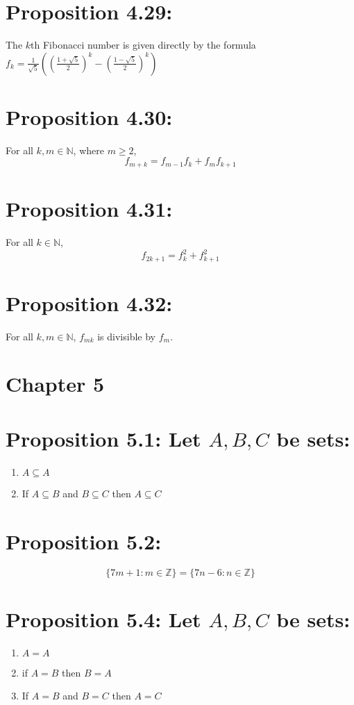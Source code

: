 \section*{Proposition 4.29:}
The $k$th Fibonacci number is given directly by the formula
$f_k = \frac{1}{\sqrt{5}} \left(\left(\frac{1 + \sqrt{5}}{2}\right)^k - \left(\frac{1 - \sqrt{5}}{2}\right)^k\right)$


\section*{Proposition 4.30:}
For all $k,m \in \mathbb{N}$, where $m \geq 2$,
\[ f_{m+k} = f_{m-1} f_k + f_m f_{k+1} \]

\section*{Proposition 4.31:}
For all $k \in \mathbb{N}$,
\[ f_{2k+1} = f_k^2 + f_{k+1}^2 \]

\section*{Proposition 4.32:}
For all $k,m \in \mathbb{N}$, $f_{mk}$ is divisible by $f_m$.

\section*{Chapter 5}

\section*{Proposition 5.1: Let $A,B,C$ be sets:}
\begin{enumerate}
    \item $A \subseteq A$
    \item If $A \subseteq B$ and $B \subseteq C$ then $A \subseteq C$
\end{enumerate}

\section*{Proposition 5.2:}
\[ \{7m+1 : m \in \mathbb{Z}\} = \{7n-6 : n \in \mathbb{Z}\} \]

\section*{Proposition 5.4: Let $A,B,C$ be sets:}
\begin{enumerate}
    \item $A = A$
    \item if $A = B$ then $B = A$
    \item If $A = B$ and $B = C$ then $A = C$
\end{enumerate}

